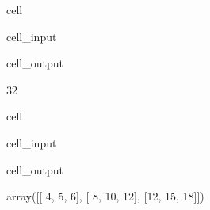 \documentclass[letterpaper,10pt,english]{jupyterBook}
\begin{document}
\begin{sphinxuseclass}{cell}\begin{sphinxVerbatimInput}

\begin{sphinxuseclass}{cell_input}
\begin{sphinxVerbatim}[commandchars=\\\{\}]
\end{sphinxVerbatim}

\end{sphinxuseclass}\end{sphinxVerbatimInput}
\begin{sphinxVerbatimOutput}

\begin{sphinxuseclass}{cell_output}
\begin{sphinxVerbatim}[commandchars=\\\{\}]
32
\end{sphinxVerbatim}

\end{sphinxuseclass}\end{sphinxVerbatimOutput}

\end{sphinxuseclass}
\begin{sphinxuseclass}{cell}\begin{sphinxVerbatimInput}

\begin{sphinxuseclass}{cell_input}
\begin{sphinxVerbatim}[commandchars=\\\{\}]
\end{sphinxVerbatim}

\end{sphinxuseclass}\end{sphinxVerbatimInput}
\begin{sphinxVerbatimOutput}

\begin{sphinxuseclass}{cell_output}
\begin{sphinxVerbatim}[commandchars=\\\{\}]
array([[ 4,  5,  6],
       [ 8, 10, 12],
       [12, 15, 18]])
\end{sphinxVerbatim}

\end{sphinxuseclass}\end{sphinxVerbatimOutput}

\end{sphinxuseclass}
\end{document}
